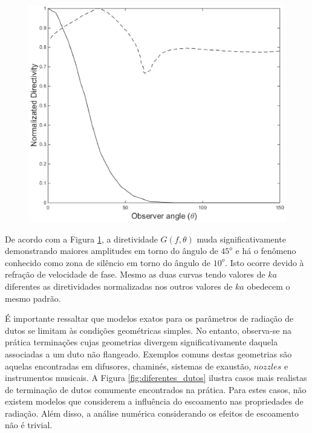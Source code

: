 \begin{figure}[ht!]
\centering
  \includegraphics[width=.9\linewidth]{figuras/directivity_comparacao.eps}
  \label{fig:comp3}
\end{figure}

\newpage
De acordo com a Figura \ref{fig:comp3}, a diretividade $G(f,\theta)$ muda significativamente demonstrando maiores amplitudes em torno do ângulo de $45^{o}$ e há o fenômeno conhecido como zona de silêncio em torno do ângulo de $10^{o}$. Isto ocorre devido à refração de velocidade de fase. Mesmo as duas curvas tendo valores de $ka$ diferentes as diretividades normalizadas nos outros valores de $ka$ obedecem o mesmo padrão.

É importante ressaltar que modelos exatos para os parâmetros de radiação de dutos se limitam às condições geométricas simples. No entanto, observa-se na prática terminações cujas geometrias divergem significativamente daquela associadas a um duto não flangeado. Exemplos comuns destas geometrias são aquelas encontradas em difusores, chaminés, sistemas de exaustão, $nozzles$ e instrumentos musicais. A Figura \ref{fig:diferentes_dutos} ilustra casos mais realistas de terminação de dutos comumente encontrados na prática. Para estes casos, não existem modelos que considerem a influência do escoamento nas propriedades de radiação. Além disso, a análise numérica considerando os efeitos de escoamento não é trivial.

